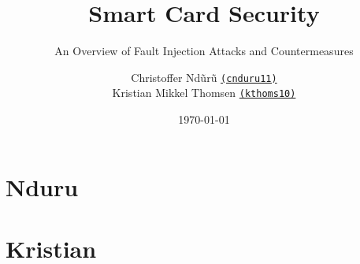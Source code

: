 \documentclass[10pt]{beamer}
\title{Smart Card Security}
\subtitle{An Overview of Fault Injection Attacks and Countermeasures} %
\date{\today}
\author[cnduru11 \and kthoms10]{
  Christoffer Nd\~ur\~u
  \href{mailto:cnuduru11@student.aau.dk}{{\tt (cnduru11)}}\\
  Kristian Mikkel Thomsen  \href{mailto:kthoms10@student.aau.dk}{{\tt (kthoms10)}}\\
}
\institute[
  Dept.\ of Distributed Systems\\
  Aalborg University\\
  Denmark
] %
{%
  Department of Distributed Systems\\
  Aalborg University\\
  Denmark
  
}
\begin{document}
{\aauwavesbg%
\begin{frame} %
  \titlepage
\end{frame}}


\section{Nduru}


\section{Kristian}


\end{document}
